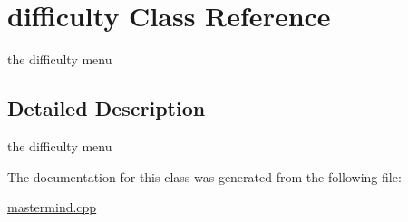 \hypertarget{classdifficulty}{\section{difficulty Class Reference}
\label{classdifficulty}
}


the difficulty menu  




\subsection{Detailed Description}
the difficulty menu 

The documentation for this class was generated from the following file\-:\begin{DoxyCompactItemize}
\item 
\hyperlink{mastermind_8cpp}{mastermind.\-cpp}\end{DoxyCompactItemize}
